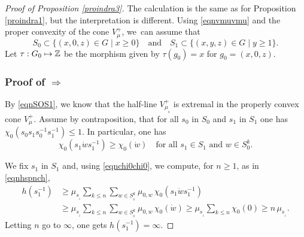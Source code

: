 \documentclass[11pt]{article}
\numberwithin{equation}{section}
\def\mto{\mathchoice{\longmapsto}{\mapsto}{\mapsto}{\mapsto}}
\theoremstyle{definition}
\newcommand{\m}[1]{\mathbb{ #1}}
\begin{document}
\begin{proof}[Proof of Proposition \ref{proindra3}]
The calculation is the same as for Proposition \ref{proindra1},
but the interpretation is different.
Using \eqref{eqnvmuvmu} and the proper convexity of the cone $V_\mu^+$,
we~can assume that\vspace*{-3pt}
\begin{equation}
\label{eqnSOS1}
S_0\subset \{ (x,0,z)\in G\mid x\geq 0\}
\quad\text{and}\quad
S_1\subset \{ (x,y,z)\in G\mid y\geq 1\}.
\end{equation}
Let $\tau:G_0\mto \m Z$ be the morphism given by
$\tau(g_0)=x$ for $g_0=(x,0,z)$.

\subsubsection*{Proof of $\Rightarrow$}
By \eqref{eqnSOS1}, we know that the half-line $V^+_{\mu_{_0}}$ is extremal
in the properly convex cone $V^+_\mu$.
Assume by contraposition, that
for all $s_0$ in $S_0$ and $s_1$ in $S_1$
one has $\chi_0(s_0s_1s_0^{-1}s_1^{-1})\leq 1$.
In particular, one has\vspace*{-3pt}
\begin{equation}
\label{eqnchi0chi0}
\chi_0(s_1\dot{w}s_1^{-1})
\geq \chi_0(\dot{w})
\quad\text{for all $s_1\in S_1$ and $w\in S_0^k$.}
\end{equation}

We fix $s_1$ in $S_1$ and, using \eqref{eqnchi0chi0}, we compute, for $n\geq 1$, as in \eqref{eqnhspnch},\vspace*{-3pt}
\begin{align*}
h(s_1^{-1})
&\geq
\mu_{s_{_1}}\sum_{k\leq n}
\sum_{w\in S_{_0}^k}\mu_{0,w}\,\chi_0(s_1\dot{w}s_1^{-1})\\[-3pt]
&\geq
\mu_{s_{_1}}\sum_{k\leq n}
\sum_{w\in S_{_0}^k}\mu_{0,w}\,\chi_0(\dot{w})\geq
\mu_{s_{_1}}\sum_{k\leq n}\chi_0(0)
\geq n\, \mu_{s_{_1}}.
\end{align*}
Letting $n$ go to $\infty$, one gets
$h(s_1^{-1})=\infty$.


\end{proof}
\end{document}
